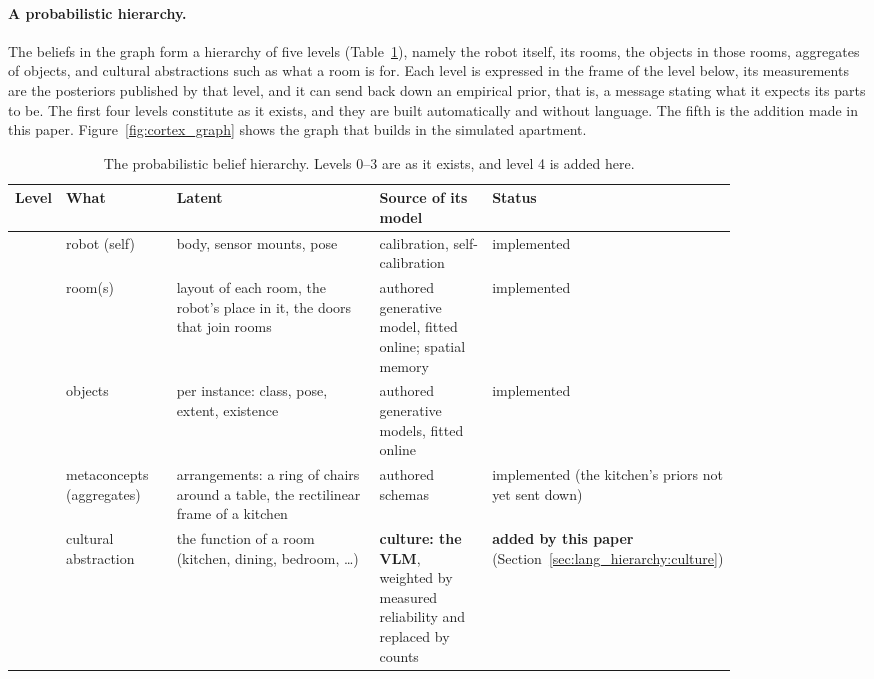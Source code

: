 \paragraph{A probabilistic hierarchy.}
The beliefs in the graph form a hierarchy of five levels (Table~\ref{tab:lh_levels}), namely the robot itself, its
rooms, the objects in those rooms, aggregates of objects, and cultural abstractions such as what a room is for. Each
level is expressed in the frame of the level below, its measurements are the posteriors published by that level, and
it can send back down an empirical prior, that is, a message stating what it expects its parts to be. The first four
levels constitute \cortex{} as it exists, and they are built automatically and without language. The fifth is the
addition made in this paper. Figure~\ref{fig:cortex_graph} shows the graph that \cortex{} builds in the simulated
apartment.

\begin{table}[ht]
    \centering
    \small
    \begin{tabular}{|>{\raggedright\arraybackslash}p{0.05\linewidth}|>{\raggedright\arraybackslash}p{0.16\linewidth}|>{\raggedright\arraybackslash}p{0.33\linewidth}|>{\raggedright\arraybackslash}p{0.17\linewidth}|>{\raggedright\arraybackslash}p{0.13\linewidth}|}
        \hline
        \textbf{Level} & \textbf{What} & \textbf{Latent} & \textbf{Source of its model} & \textbf{Status} \\ \hline
        0 & robot (self) & body, sensor mounts, pose & calibration, self-calibration & implemented \\ \hline
        1 & room(s) & layout of each room, the robot's place in it, the doors that join rooms & authored generative model, fitted online; spatial memory & implemented \\ \hline
        2 & objects & per instance: class, pose, extent, existence & authored generative models, fitted online & implemented \\ \hline
        3 & metaconcepts (aggregates) & arrangements: a ring of chairs around a table, the rectilinear frame of a kitchen & authored schemas & implemented (the kitchen's priors not yet sent down) \\ \hline
        4 & cultural abstraction & the function of a room (kitchen, dining, bedroom, \ldots) & \textbf{culture: the VLM}, weighted by measured reliability and replaced by counts & \textbf{added by this paper} (Section~\ref{sec:lang_hierarchy:culture}) \\ \hline
    \end{tabular}
    \caption{The probabilistic belief hierarchy. Levels 0--3 are \cortex{} as it exists, and level 4 is added here.}
    \label{tab:lh_levels}
\end{table}




